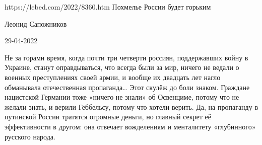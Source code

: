 










https://lebed.com/2022/8360.htm
Похмелье России будет горьким

Леонид Сапожников

29-04-2022

Не за горами время, когда почти три четверти
россиян,
поддержавших войну в Украине, станут оправдываться, что всегда
были за мир,
ничего не ведали о военных преступлениях своей армии, и вообще их
двадцать лет
нагло обманывала отечественная пропаганда… Этот скулёж до боли
знаком. Граждане
нацистской Германии тоже «ничего не знали» об Освенциме, потому
что не желали
знать, и верили Геббельсу, потому что хотели верить. Да, на
пропаганду в
путинской России тратятся огромные деньги, но главный секрет её
эффективности в
другом: она отвечает вожделениям и менталитету «глубинного»
русского
народа. 

